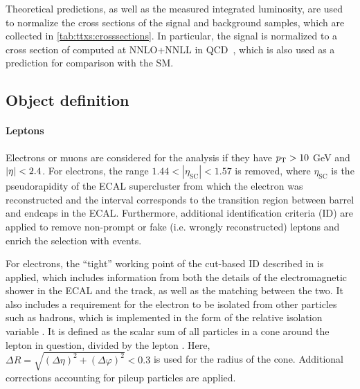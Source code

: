 Theoretical predictions, as well as the measured integrated luminosity, are used to normalize the cross sections of the signal and background samples, which are collected in \cref{tab:ttxs:crosssections}. In particular, the \ttbar signal is normalized to a cross section of \xsecpred computed at NNLO+NNLL in QCD~\cite{Czakon:2011xx}, which is also used as a prediction for comparison with the SM.

\subsection{Object definition}
\label{sec:ttxs:objects}

\paragraph{Leptons}

Electrons or muons are considered for the analysis if they have $p_{\mathrm{T}} > 10$ GeV and $|\eta| < 2.4$. For electrons, the range $1.44 < |\eta_{\mathrm{SC}}| < 1.57$ is removed, where $\eta_{\mathrm{SC}}$ is the pseudorapidity of the ECAL supercluster from which the electron was reconstructed and the interval corresponds to the transition region between barrel and endcaps in the ECAL. Furthermore, additional identification criteria (ID) are applied to remove non-prompt or fake (i.e. wrongly reconstructed) leptons and enrich the selection with \ttbar events.

For electrons, the ``tight'' working point of the cut-based ID described in  is applied, which includes information from both the details of the electromagnetic shower in the ECAL and the track, as well as the matching between the two. It also includes a requirement for the electron to be isolated from other particles such as hadrons, which is implemented in the form of the relative isolation variable \Irel. It is defined as the scalar \pt sum of all particles in a cone around the lepton in question, divided by the lepton \pt. Here, $\Delta R = \sqrt{(\Delta \eta)^2 + (\Delta \varphi)^2} < 0.3$ is used for the radius of the cone. Additional corrections accounting for pileup particles are applied.

